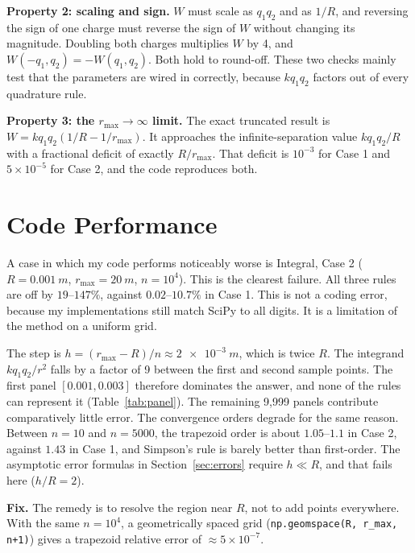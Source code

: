 \documentclass[11pt]{article}
\newcommand{\rmax}{r_{\max}}
\begin{document}
\textbf{Property 2: scaling and sign.} $W$ must scale as $q_1q_2$ and as $1/R$, and reversing the sign of one charge must reverse the sign of $W$ without changing its magnitude. Doubling both charges multiplies $W$ by 4, and $W(-q_1, q_2) = -W(q_1, q_2)$. Both hold to round-off. These two checks mainly test that the parameters are wired in correctly, because $kq_1q_2$ factors out of every quadrature rule.

\textbf{Property 3: the $\rmax \to \infty$ limit.} The exact truncated result is $W = kq_1q_2(1/R - 1/\rmax)$. It approaches the infinite-separation value $kq_1q_2/R$ with a fractional deficit of exactly $R/\rmax$. That deficit is $10^{-3}$ for Case 1 and $5\times10^{-5}$ for Case 2, and the code reproduces both.

\section{Code Performance}

A case in which my code performs noticeably worse is Integral, Case 2 ($R = \SI{0.001}{m}$, $\rmax = \SI{20}{m}$, $n = 10^4$). This is the clearest failure. All three rules are off by $19$--$147\%$, against $0.02$--$10.7\%$ in Case 1. This is not a coding error, because my implementations still match SciPy to all digits. It is a limitation of the method on a uniform grid.

The step is $h = (\rmax - R)/n \approx \SI{2e-3}{m}$, which is twice $R$. The integrand $kq_1q_2/r^2$ falls by a factor of 9 between the first and second sample points. The first panel $[0.001, 0.003]$ therefore dominates the answer, and none of the rules can represent it (Table~\ref{tab:panel}). The remaining 9,999 panels contribute comparatively little error. The convergence orders degrade for the same reason. Between $n = 10$ and $n = 5000$, the trapezoid order is about $1.05$--$1.1$ in Case 2, against $1.43$ in Case 1, and Simpson's rule is barely better than first-order. The asymptotic error formulas in Section~\ref{sec:errors} require $h \ll R$, and that fails here ($h/R = 2$).

\textbf{Fix.} The remedy is to resolve the region near $R$, not to add points everywhere. With the same $n = 10^4$, a geometrically spaced grid (\texttt{np.geomspace(R, r\_max, n+1)}) gives a trapezoid relative error of $\approx 5\times10^{-7}$.
\end{document}
